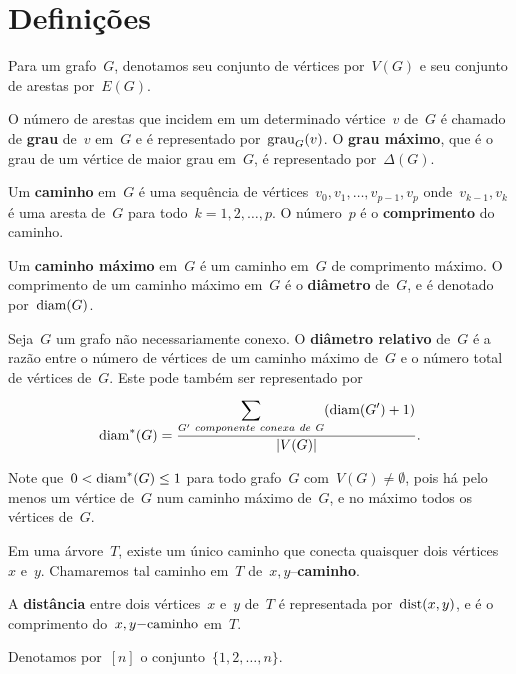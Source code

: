\section{Definições}
	
	Para um grafo~$G$, denotamos seu
	conjunto de vértices por~$V(G)$ e seu
	conjunto de arestas por~$E(G)$.

\bigskip
	O número de arestas que incidem em um 
	determinado vértice~$v$ de~$G$ é chamado de 
	\textbf{grau} de~$v$ em~$G$ e é representado
	por~$\mathrm{grau}_G(v)$. O 
	\textbf{grau máximo}, que é o grau de um vértice de
	maior grau em~$G$, é representado por~$\Delta(G)$.

\bigskip

	Um \textbf{caminho} em~$G$ é uma sequência de 
	vértices~$v_0, v_1, \ldots,v_{p-1}, v_p$ 
	onde~$v_{k-1}, v_k$ é uma aresta de~$G$ para 
	todo~${k =1,2, \ldots, p}$. 
	O número~$p$ é o \textbf{comprimento} do caminho.

\bigskip

	Um \textbf{caminho máximo} em~$G$ é um caminho 
	em~$G$ de comprimento máximo.
	O comprimento de um caminho máximo em~$G$
	é o \textbf{diâmetro} de~$G$, e é denotado por~$\mathrm{diam}(G)$.



	Seja~$G$ um grafo não necessariamente conexo.
	O \textbf{diâmetro relativo} de~$G$
	 é a razão entre o número
	de vértices de um caminho máximo de~$G$ e o número total de vértices
	de~$G$. Este pode também ser representado por
	$$ \mathrm{diam}^*(G) =\dfrac{\displaystyle\sum_{
	G'~componente~conexa~de~G}^{}(\mathrm{diam}(G')+1)}{|V(G)|}.$$

	Note que~${0<\mathrm{diam}^*(G)\le 1}$ para todo grafo~$G$ 
	com~${V(G)\ne \emptyset}$, pois há pelo menos um vértice 
	de~$G$ num caminho máximo de~$G$, e no máximo 
	todos os vértices de~$G$.

\bigskip

	Em uma árvore~$T$, existe um único caminho que conecta 
	quaisquer dois vértices~$x$ e~$y$. 
	Chamaremos tal caminho em~$T$ de~$x,y$--\textbf{caminho}.

\bigskip

	A \textbf{distância} entre dois vértices~$x$ e~$y$ de~$T$ é 
	representada por~$\mathrm{dist}(x,y)$, e é o comprimento 
	do~$x,y\mathrm{-caminho}$ em~$T$.

\bigskip

	Denotamos por~$[n]$
	o conjunto~$\{1,2,\ldots,n\}$.

